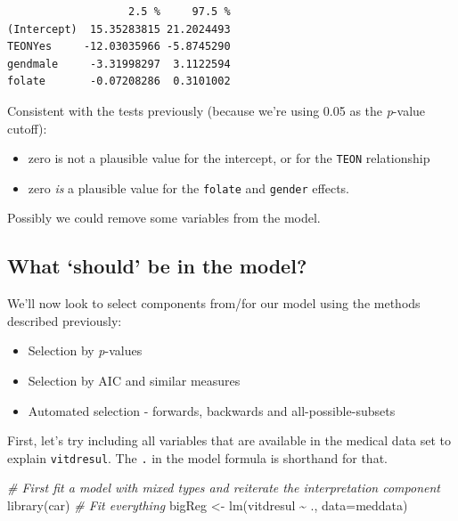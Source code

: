\documentclass[
  oneside]{krantz}
\newenvironment{Shaded}{\begin{snugshade}}{\end{snugshade}}
\newcommand{\AttributeTok}[1]{\textcolor[rgb]{0.77,0.63,0.00}{#1}}
\newcommand{\CommentTok}[1]{\textcolor[rgb]{0.56,0.35,0.01}{\textit{#1}}}
\newcommand{\FunctionTok}[1]{\textcolor[rgb]{0.00,0.00,0.00}{#1}}
\newcommand{\NormalTok}[1]{#1}
\newcommand{\OtherTok}[1]{\textcolor[rgb]{0.56,0.35,0.01}{#1}}
\newcommand{\SpecialCharTok}[1]{\textcolor[rgb]{0.00,0.00,0.00}{#1}}
\providecommand{\tightlist}{%
  \setlength{\itemsep}{0pt}\setlength{\parskip}{0pt}}
\begin{document}
\begin{verbatim}
                   2.5 %     97.5 %
(Intercept)  15.35283815 21.2024493
TEONYes     -12.03035966 -5.8745290
gendmale     -3.31998297  3.1122594
folate       -0.07208286  0.3101002
\end{verbatim}

Consistent with the tests previously (because we're using 0.05 as the \emph{p}-value cutoff):

\begin{itemize}
\tightlist
\item
  zero is not a plausible value for the intercept, or for the \texttt{TEON} relationship
\item
  zero \emph{is} a plausible value for the \texttt{folate} and \texttt{gender} effects.
\end{itemize}

Possibly we could remove some variables from the model.

\hypertarget{what-should-be-in-the-model}{%
\subsection{What `should' be in the model?}\label{what-should-be-in-the-model}}

We'll now look to select components from/for our model using the methods described previously:

\begin{itemize}
\tightlist
\item
  Selection by \emph{p}-values
\item
  Selection by AIC and similar measures
\item
  Automated selection - forwards, backwards and all-possible-subsets
\end{itemize}

First, let's try including all variables that are available in the medical data set to explain \texttt{vitdresul}. The \texttt{.} in the model formula is shorthand for that.

\begin{Shaded}
\begin{Highlighting}[]
\CommentTok{\# First fit a model with mixed types and reiterate the interpretation component}
\FunctionTok{library}\NormalTok{(car)}
\CommentTok{\# Fit everything}
\NormalTok{bigReg }\OtherTok{\textless{}{-}} \FunctionTok{lm}\NormalTok{(vitdresul }\SpecialCharTok{\textasciitilde{}}\NormalTok{ ., }\AttributeTok{data=}\NormalTok{meddata)}
\end{Highlighting}
\end{Shaded}
\end{document}
